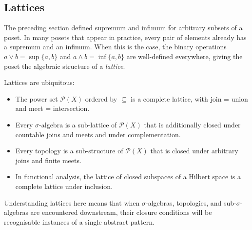 
\subsection{Lattices}\label{sec:lattices}



\begin{exposition}
The preceding section defined supremum and infimum for arbitrary subsets of a
poset.  In many posets that appear in practice, every pair of elements already
has a supremum and an infimum.  When this is the case, the binary operations
$a \vee b = \sup\{a,b\}$ and $a \wedge b = \inf\{a,b\}$ are well-defined
everywhere, giving the poset the algebraic structure of a \emph{lattice}.
\end{exposition}

\begin{exposition}
Lattices are ubiquitous:
\end{exposition}
\begin{itemize}
  \item The power set $\mathcal{P}(X)$ ordered by $\subseteq$ is a complete
        lattice, with join = union and meet = intersection.
  \item Every $\sigma$-algebra is a sub-lattice of $\mathcal{P}(X)$
        that is additionally closed under countable joins and meets and under
        complementation.
  \item Every topology is a sub-structure of $\mathcal{P}(X)$ that is closed
        under arbitrary joins and finite meets.
  \item In functional analysis, the lattice of closed subspaces of a Hilbert
        space is a complete lattice under inclusion.
\end{itemize}
\begin{exposition}
Understanding lattices here means that when $\sigma$-algebras, topologies, and
sub-$\sigma$-algebras are encountered downstream, their closure conditions
will be recognisable instances of a single abstract pattern.
\end{exposition}

